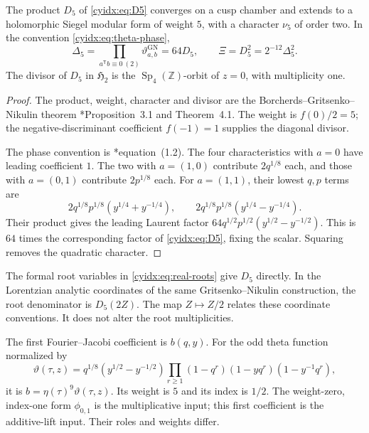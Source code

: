 \begin{theorem}\label{cyidx:thm:automorphic}
The product \(D_5\) of \eqref{cyidx:eq:D5} converges
on a cusp chamber and extends to a holomorphic
Siegel modular form of weight \(5\), with a character
\(\nu_5\) of order two. In the convention
\eqref{cyidx:eq:theta-phase},
\begin{equation}\label{cyidx:eq:normalization}
 \Delta_5=\prod_{a^{\mathsf T}b\equiv0\ (2)}
                \vartheta^{\mathrm{GN}}_{a,b}=64D_5,
 \qquad \Xi=D_5^2=2^{-12}\Delta_5^2.
\end{equation}
The divisor of \(D_5\) in \(\mathfrak H_2\) is the
\(\operatorname{Sp}_4(\mathbb Z)\)-orbit of \(z=0\),
with multiplicity one.
\end{theorem}
\begin{proof}
The product, weight, character and divisor are the
Borcherds--Gritsenko--Nikulin theorem
\cite{GN97}*{Proposition~3.1 and Theorem~4.1}.
The weight is \(f(0)/2=5\); the negative-discriminant
coefficient \(f(-1)=1\) supplies the diagonal divisor.

The phase convention is \cite{GN97}*{equation~(1.2)}.
The four characteristics with \(a=0\) have leading
coefficient \(1\). The two with \(a=(1,0)\) contribute
\(2q^{1/8}\) each, and those with \(a=(0,1)\)
contribute \(2p^{1/8}\) each.
For \(a=(1,1)\), their lowest \(q,p\) terms are
\[
 2q^{1/8}p^{1/8}(y^{1/4}+y^{-1/4}),\qquad
 2q^{1/8}p^{1/8}(y^{1/4}-y^{-1/4}).
\]
Their product gives the leading Laurent factor
\(64q^{1/2}p^{1/2}(y^{1/2}-y^{-1/2})\).
This is \(64\) times the corresponding factor of
\eqref{cyidx:eq:D5}, fixing the scalar.
Squaring removes the quadratic character.
\end{proof}

The formal root variables in \eqref{cyidx:eq:real-roots}
give \(D_5\) directly. In the Lorentzian analytic
coordinates of the same Gritsenko--Nikulin construction,
the root denominator is \(D_5(2Z)\).
The map \(Z\mapsto Z/2\) relates these coordinate
conventions. It does not alter the root multiplicities.

The first Fourier--Jacobi coefficient is \(b(q,y)\).
For the odd theta function normalized by
\[
 \vartheta(\tau,z)=q^{1/8}(y^{1/2}-y^{-1/2})
    \prod_{r\geq1}(1-q^r)(1-yq^r)(1-y^{-1}q^r),
\]
it is \(b=\eta(\tau)^9\vartheta(\tau,z)\).
Its weight is \(5\) and its index is \(1/2\).
The weight-zero, index-one form \(\phi_{0,1}\)
is the multiplicative input; this first coefficient
is the additive-lift input. Their roles and weights differ.

